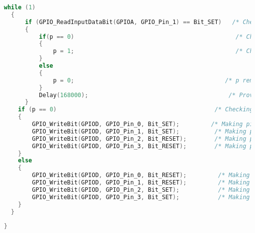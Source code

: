 \begin{lstlisting}[language=C++]
  while (1)
  {
	  if (GPIO_ReadInputDataBit(GPIOA, GPIO_Pin_1) == Bit_SET)   /* Checking if Input is High or not */
	  {
		  if(p == 0)                                              /* Checking value of p */
		  {
			  p = 1;                                              /* Changing value of p if condition is true */
		  }
		  else
		  {
			  p = 0;                                           /* p remains same if condition true */
		  }
		  Delay(168000);                                        /* Provide Delay */
	  }
	if (p == 0)                                             /* Checking condition by seeing value of p */
	{
		GPIO_WriteBit(GPIOD, GPIO_Pin_0, Bit_SET);         /* Making pin PD0 to set high */
		GPIO_WriteBit(GPIOD, GPIO_Pin_1, Bit_SET);          /* Making pin PD1 to set high */
		GPIO_WriteBit(GPIOD, GPIO_Pin_2, Bit_RESET);        /* Making pin PD2 to set low */
		GPIO_WriteBit(GPIOD, GPIO_Pin_3, Bit_RESET);        /* Making pin PD3 to set low */
	}
	else
	{
		GPIO_WriteBit(GPIOD, GPIO_Pin_0, Bit_RESET);         /* Making pin PD0 to set low */
		GPIO_WriteBit(GPIOD, GPIO_Pin_1, Bit_RESET);         /* Making pin PD1 to set low */
		GPIO_WriteBit(GPIOD, GPIO_Pin_2, Bit_SET);           /* Making pin PD2 to set high */
		GPIO_WriteBit(GPIOD, GPIO_Pin_3, Bit_SET);           /* Making pin PD3 to set high */
	}
  }
  
}

\end{lstlisting}
